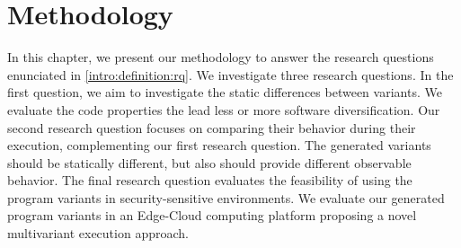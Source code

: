 \chapter{Methodology} 
\label{chapter:method}

\pagestyle{plain}
\newcommand{\libsodiumfunctions}{869}
\newcommand{\qrcodefunctions}{1849}
\newcommand{\allmewefunctions}{\libsodiumfunctions + \qrcodefunctions}

\newcommand{\py}[1]{}
\newcommand{\fromjson}[2]{}

\newcommand{\corpusrosetta}{Rosetta\xspace}
\newcommand{\corpussodium}{Libsodium\xspace}
\newcommand{\corpusqrcode}{QrCode\xspace}


\newcommand{\DTWStatic}{dt\_static\xspace}
\newcommand{\DTW}{TraceDiff\xspace}
\renewcommand{\tool}{CROW\xspace}


In this chapter, we present our methodology to answer the research questions enunciated in \autoref{intro:definition:rq}.
We investigate three research questions. In the first question, we aim to investigate the static differences between variants. We evaluate the code properties the lead less or more software diversification.
Our second research question focuses on comparing their behavior during their execution, complementing our first research question. The generated variants should be statically different, but also should provide different observable behavior. 
The final research question evaluates the feasibility of using the program variants in security-sensitive environments. We evaluate our generated program variants in an Edge-Cloud computing platform proposing a novel multivariant execution approach.

